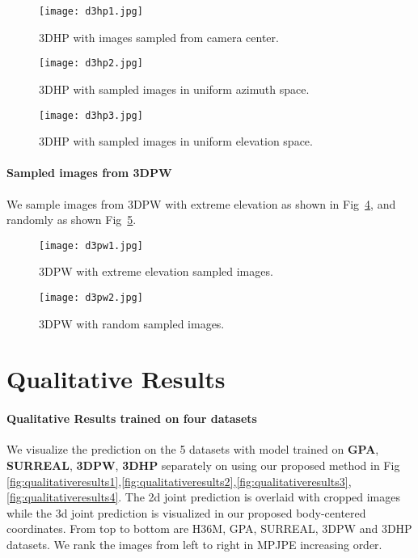 \documentclass[runningheads]{llncs}
\begin{document}
\begin{figure*}[t]
\centering
\begin{subfigure}{0.96\textwidth}
\texttt{[image: d3hp1.jpg]}
\caption{3DHP with images sampled from camera center.} \label{fig:d3hpcenter}
\end{subfigure}
\hspace*{\fill}
\begin{subfigure}{0.96\textwidth}
\texttt{[image: d3hp2.jpg]}
\caption{3DHP with sampled images in uniform azimuth space.} \label{fig:d3hpazimuth}
\end{subfigure}
\hspace*{\fill}
\begin{subfigure}{0.96\textwidth}
\texttt{[image: d3hp3.jpg]}
\caption{3DHP with sampled images in uniform elevation space.} \label{fig:d3hpelevation}
\end{subfigure}
\caption{3DHP sampled images.} 
\label{fig:d3hps}
\end{figure*}


\paragraph{Sampled images from 3DPW} We sample images from 3DPW with extreme elevation as shown in Fig~\ref{fig:d3pw1}, and randomly as shown Fig~\ref{fig:d3pw2}.

\begin{figure*}[t]
\centering
\begin{subfigure}{0.96\textwidth}
\texttt{[image: d3pw1.jpg]}
\caption{3DPW with extreme elevation sampled images.} \label{fig:d3pw1}
\end{subfigure}
\hspace*{\fill}
\begin{subfigure}{0.96\textwidth}
\texttt{[image: d3pw2.jpg]}
\caption{3DPW with random sampled images.} \label{fig:d3pw2}
\end{subfigure}
\caption{3DPW sampled images.} 
\label{fig:d3pws}
\end{figure*}




\section{Qualitative Results}

\paragraph{Qualitative Results trained on four datasets} We visualize the prediction on the 5 datasets with model trained on \textbf{GPA}, \textbf{SURREAL}, \textbf{3DPW}, \textbf{3DHP} separately on using our proposed method in Fig \ref{fig:qualitativeresults1},\ref{fig:qualitativeresults2},\ref{fig:qualitativeresults3},\ref{fig:qualitativeresults4}. The 2d joint prediction is overlaid with cropped images while the 3d joint prediction is visualized in our proposed body-centered coordinates. From top to bottom are H36M, GPA, SURREAL, 3DPW and 3DHP datasets. We rank the images from left to right in MPJPE increasing order.
\end{document}
